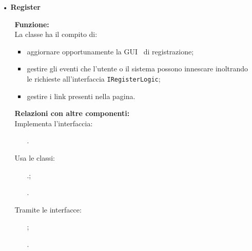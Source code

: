 {\begin{sloppypar}
{\begin{itemize}
\begin{itemize}
				\texttt{@UiHandler void onLogUserSubmitClick(ClickEvent event);}\\
				All'evento \texttt{Click} dell'oggetto \texttt{LogUserSubmit} i dati inseriti all'interno dei campi \texttt{BoxUtente} e \texttt{BoxPassword} vengono inseriti in un vettore e inviati attraverso il riferimento \texttt{logUserLogic} al metodo \texttt{validateData(Vector<String>)} per effettuare il controllo dei dati di autenticazione.\\
		\end{itemize}

		\item[•] \textbf{Register}
		\begin{itemize}
			\item[] \textbf{Funzione:}\\
				  La classe ha il compito di:
				\begin{itemize}
					\item aggiornare opportunamente la GUI\g~ di registrazione;
					\item gestire gli eventi che l’utente o il sistema possono innescare inoltrando le richieste all'interfaccia \texttt{IRegisterLogic};
					\item gestire i link presenti nella pagina.
				\end{itemize}
				
			\item[] \textbf{Relazioni con altre componenti:}\\
				Implementa l'interfaccia:
				\begin{itemize}
					\item[] . 
				\end{itemize}
				Usa le classi:
				\begin{itemize}
					\item[] .;
					\item[] .
				\end{itemize}
				Tramite le interfacce:
				\begin{itemize}
					\item[] ; 
					\item[] .
				\end{itemize}


\end{itemize}
\end{itemize}}
\end{sloppypar}}
